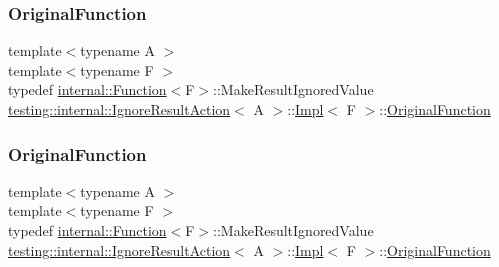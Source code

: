 \mbox{\label{classtesting_1_1internal_1_1_ignore_result_action_1_1_impl_a00db745de37ebae1ee631240098bc2b1}} 
\subsubsection{\texorpdfstring{OriginalFunction}{OriginalFunction}\hspace{0.1cm}{\footnotesize\ttfamily [2/3]}}
{\footnotesize\ttfamily template$<$typename A $>$ \\
template$<$typename F $>$ \\
typedef \mbox{\hyperlink{structtesting_1_1internal_1_1_function}{internal\+::\+Function}}$<$F$>$\+::Make\+Result\+Ignored\+Value \mbox{\hyperlink{classtesting_1_1internal_1_1_ignore_result_action}{testing\+::internal\+::\+Ignore\+Result\+Action}}$<$ A $>$\+::\mbox{\hyperlink{classtesting_1_1internal_1_1_ignore_result_action_1_1_impl}{Impl}}$<$ F $>$\+::\mbox{\hyperlink{classtesting_1_1internal_1_1_ignore_result_action_1_1_impl_a00db745de37ebae1ee631240098bc2b1}{Original\+Function}}\hspace{0.3cm}{\ttfamily [private]}}

\mbox{\label{classtesting_1_1internal_1_1_ignore_result_action_1_1_impl_a00db745de37ebae1ee631240098bc2b1}} 
\subsubsection{\texorpdfstring{OriginalFunction}{OriginalFunction}\hspace{0.1cm}{\footnotesize\ttfamily [3/3]}}
{\footnotesize\ttfamily template$<$typename A $>$ \\
template$<$typename F $>$ \\
typedef \mbox{\hyperlink{structtesting_1_1internal_1_1_function}{internal\+::\+Function}}$<$F$>$\+::Make\+Result\+Ignored\+Value \mbox{\hyperlink{classtesting_1_1internal_1_1_ignore_result_action}{testing\+::internal\+::\+Ignore\+Result\+Action}}$<$ A $>$\+::\mbox{\hyperlink{classtesting_1_1internal_1_1_ignore_result_action_1_1_impl}{Impl}}$<$ F $>$\+::\mbox{\hyperlink{classtesting_1_1internal_1_1_ignore_result_action_1_1_impl_a00db745de37ebae1ee631240098bc2b1}{Original\+Function}}\hspace{0.3cm}{\ttfamily [private]}}

